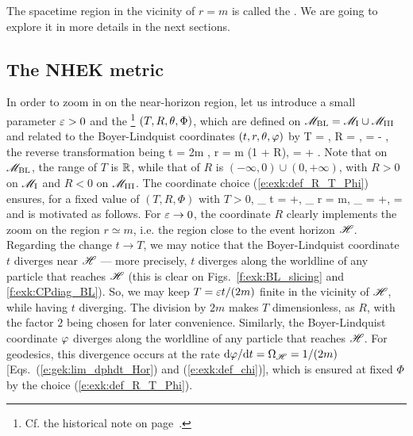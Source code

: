The spacetime region in the vicinity of $r=m$ is called the
.
We are going to explore it in more details in the next sections.

\subsection{The NHEK metric} \label{s:exk:NHEK_metric}

In order to zoom in on the near-horizon region, let us introduce
a small parameter $\varepsilon >0$ and
the \footnote{Cf. the historical note on
page~\pageref{h:exk:NHEK_metric}.} $(T,R,\theta,\Phi)$, which are defined on $\mathscr{M}_{\rm BL} = \mathscr{M}_{\rm I} \cup \mathscr{M}_{\rm III}$
and related to the Boyer-Lindquist coordinates
$(t,r,\theta,\varphi)$ by
\be \label{e:exk:R_T_Phi_BL}
    T = \veps {}, \quad
    R = , \quad
    \Phi = \ph -  ,
\ee
the reverse transformation being
\be \label{e:exk:def_R_T_Phi}
    t = 2m ,\quad
    r = m (1 + \veps R),\quad
    \ph = \Phi +  .
\ee
Note that on $\mathscr{M}_{\rm BL}$, the range of $T$ is $\mathbb{R}$, while
that of $R$ is $(-\infty,0)\cup(0,+\infty)$, with $R>0$ on $\mathscr{M}_{\rm I}$
and $R<0$ on $\mathscr{M}_{\rm III}$.
The coordinate choice (\ref{e:exk:def_R_T_Phi}) ensures, for a fixed value of $(T,R,\Phi)$ with $T>0$,
\be
    \lim_{\veps{}} t = +\infty,\quad
    \lim_{\veps{}} r = m, \quad
    \lim_{\veps{}} \ph = +\infty,\quad
     = 
\ee
and is motivated as follows.
For $\varepsilon\to 0$,
the coordinate $R$ clearly implements the zoom on the region $r\simeq m$,
i.e. the region close to the event horizon $\mathscr{H}$.
Regarding the change $t\to T$, we may notice that the Boyer-Lindquist coordinate
$t$ diverges near  $\mathscr{H}$ --- more precisely,
$t$ diverges along the worldline of any particle that reaches $\mathscr{H}$
(this is clear on Figs.~\ref{f:exk:BL_slicing} and \ref{f:exk:CPdiag_BL}).
So, we may keep $T = \varepsilon t/(2m)$ finite in the vicinity of $\mathscr{H}$, while having
$t$ diverging. The division by $2m$ makes $T$ dimensionless, as $R$, with the
factor $2$ being chosen for later convenience.
Similarly, the Boyer-Lindquist coordinate $\varphi$ diverges along the worldline of any particle that reaches $\mathscr{H}$.
For geodesics, this divergence occurs at the rate $\mathrm{d}\varphi/\mathrm{d} t = \Omega_{\mathscr{H}} = 1/(2m)$
[Eqs.~(\ref{e:gek:lim_dphdt_Hor}) and (\ref{e:exk:def_chi})], which is ensured
at fixed $\Phi$ by the choice (\ref{e:exk:def_R_T_Phi}).

